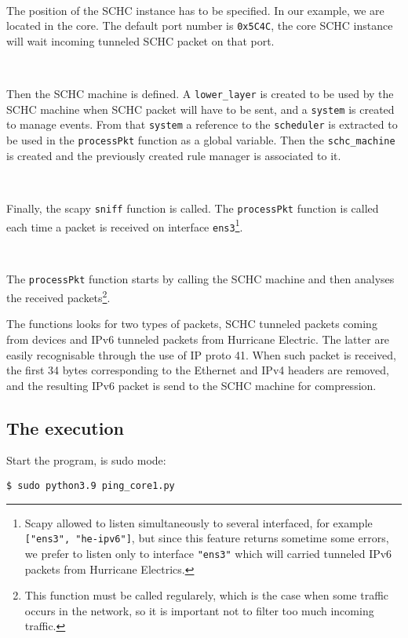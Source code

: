 \documentclass[onecolumn,12pt]{book}
\newcounter{c}
\begin{document}
~~

The position of the SCHC instance has to be specified. In our example, we are located in the core. The default port number is \texttt{0x5C4C}, the core SCHC instance will wait incoming tunneled SCHC packet on that port.

~~~

Then the SCHC machine is defined. A \texttt{lower\_layer} is created to be used by the SCHC machine when SCHC packet will have to be sent, and a \texttt{system} is created to manage events. From that \texttt{system} a reference to the \texttt{scheduler} is extracted to be used in the \texttt{processPkt} function as a global variable. Then the \texttt{schc\_machine} is created and the previously created rule manager is associated to it.

~~~

Finally, the scapy \texttt{sniff} function is called. The \texttt{processPkt} function is called each time a packet is received on interface \texttt{ens3}\footnote{Scapy allowed to listen simultaneously to several interfaced, for example \texttt{["ens3", "he-ipv6"]}, but since this feature returns sometime some errors, we prefer to listen only to interface \texttt{"ens3"} which will carried tunneled IPv6 packets from Hurricane Electrics.}.

~~~

The \texttt{processPkt} function starts by calling the SCHC machine and then analyses the received packets\footnote{This function must be called regularely, which is the case when some traffic occurs in the network, so it is important not to filter too much incoming traffic.}. 

The functions looks for two types of packets, SCHC tunneled packets coming from devices and IPv6 tunneled packets from Hurricane Electric. The latter are easily recognisable through the use of IP proto 41. When such packet is received, the first 34 bytes corresponding to the Ethernet and IPv4 headers are removed, and the resulting IPv6 packet is send to the SCHC machine for compression.

\subsection{The execution}

Start the program, is sudo mode:

\begin{lstlisting}
$ sudo python3.9 ping_core1.py 
\end{lstlisting}
\end{document}
